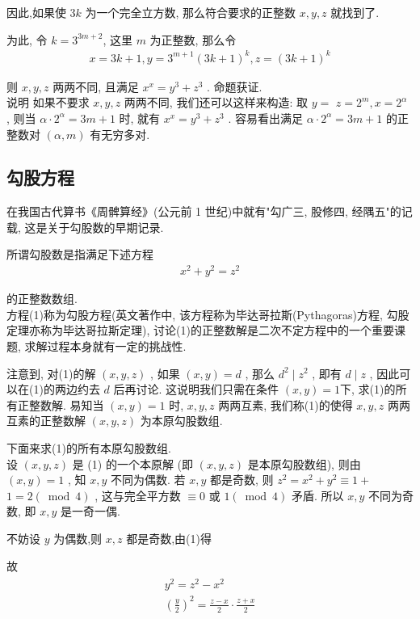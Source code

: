 因此,如果使 $3 k$ 为一个完全立方数, 那么符合要求的正整数 $x ,  y ,  z$ 就找到了.

为此, 令 $k=3^{3 m+2}$, 这里 $m$ 为正整数, 那么令
\begin{align*}
	x=3 k+1, y=3^{m+1}(3 k+1)^{k}, z=(3 k+1)^{k}
\end{align*}

则 $x ,  y ,  z$ 两两不同, 且满足 $x^{x}=y^{3}+z^{3}$ . 命题获证. \\
说明 如果不要求 $x ,  y ,  z$ 两两不同, 我们还可以这样来构造: 取 $y=$ $z=2^{m} ,  x=2^{\alpha}$ , 则当 $\alpha \cdot 2^{\alpha}=3 m+1$ 时, 就有 $x^{x}=y^{3}+z^{3}$ . 容易看出满足 $\alpha \cdot 2^{\alpha}=3 m+1$ 的正整数对 $(\alpha, m)$ 有无穷多对.

\subsection{勾股方程}
在我国古代算书《周髀算经》(公元前 1 世纪)中就有"勾广三, 股修四, 经隅五"的记载, 这是关于勾股数的早期记录.

所谓勾股数是指满足下述方程
\begin{align*}
	x^{2}+y^{2}=z^{2}
\end{align*}

的正整数数组.\\
方程(1)称为勾股方程(英文著作中, 该方程称为毕达哥拉斯(Pythagoras)方程, 勾股定理亦称为毕达哥拉斯定理), 讨论(1)的正整数解是二次不定方程中的一个重要课题, 求解过程本身就有一定的挑战性.

注意到, 对(1)的解 $(x, y, z)$ , 如果 $(x, y)=d$ , 那么 $d^{2} \mid z^{2}$ , 即有 $d \mid z$ , 因此可以在(1)的两边约去 $d$ 后再讨论. 这说明我们只需在条件 $(x, y)=1$下, 求(1)的所有正整数解. 易知当 $(x, y)=1$ 时,  $x ,  y ,  z$ 两两互素, 我们称(1)的使得 $x ,  y ,  z$ 两两互素的正整数解 $(x, y, z)$ 为本原勾股数组.

下面来求(1)的所有本原勾股数组. \\
设 $(x, y, z)$ 是 (1) 的一个本原解 (即 $(x, y, z)$ 是本原勾股数组), 则由\\
$(x, y)=1$ , 知 $x ,  y$ 不同为偶数. 若 $x ,  y$ 都是奇数, 则 $z^{2}=x^{2}+y^{2} \equiv 1+$ $1=2(\bmod 4)$ , 这与完全平方数 $\equiv 0$ 或 $1(\bmod 4)$ 矛盾. 所以 $x ,  y$ 不同为奇数, 即 $x ,  y$ 是一奇一偶.

不妨设 $y$ 为偶数,则 $x ,  z$ 都是奇数,由(1)得

故
\begin{align*}
	\begin{gathered}
		y^{2}=z^{2}-x^{2} \\
		\left(\frac{y}{2}\right)^{2}=\frac{z-x}{2} \cdot \frac{z+x}{2}
	\end{gathered}
\end{align*}

